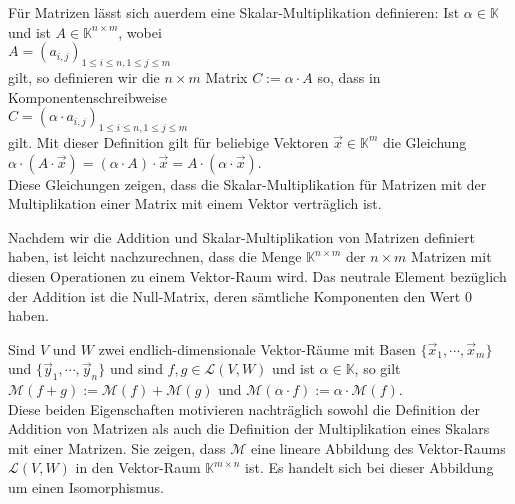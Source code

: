 F\"{u}r Matrizen l\"{a}sst sich au\3erdem eine Skalar-Multiplikation definieren:  Ist $\alpha \in \mathbb{K}$
und ist $A \in \mathbb{K}^{n \times m}$, wobei
\\[0.2cm]
\hspace*{1.3cm}
$A = (a_{i,j})_{1\leq i \leq n, 1 \leq j \leq m}$
\\[0.2cm]
gilt, so definieren wir die $n \times m$ Matrix 
$C := \alpha \cdot A$ so, dass in Komponentenschreibweise
\\[0.2cm]
\hspace*{1.3cm}
$C = (\alpha \cdot a_{i,j})_{1\leq i \leq n, 1 \leq j \leq m}$ 
\\[0.2cm]
gilt.  Mit
dieser Definition gilt f\"{u}r beliebige Vektoren $\vec{x} \in \mathbb{K}^m$ die Gleichung
\\[0.2cm]
\hspace*{1.3cm}
$\alpha \cdot (A \cdot \vec{x}) = (\alpha \cdot A) \cdot \vec{x} = A \cdot (\alpha \cdot \vec{x})$.
\\[0.2cm]
Diese Gleichungen zeigen, dass die Skalar-Multiplikation f\"{u}r Matrizen mit der Multiplikation einer
Matrix mit einem Vektor vertr\"{a}glich ist.

\remark
Nachdem wir die Addition und Skalar-Multiplikation von Matrizen definiert haben, ist leicht
nachzurechnen, dass die Menge $\mathbb{K}^{n \times m}$ der $n \times m$ Matrizen mit diesen
Operationen zu einem Vektor-Raum wird.  Das neutrale Element bez\"{u}glich der Addition ist die
Null-Matrix, deren s\"{a}mtliche Komponenten den Wert $0$ haben.

\remark
Sind $V$ und $W$ zwei endlich-dimensionale Vektor-R\"{a}ume mit Basen
$\{\vec{x}_1, \cdots, \vec{x}_m\}$ und $\{\vec{y}_1, \cdots, \vec{y}_n\}$ und sind $f, g \in \mathcal{L}(V, W)$ und ist $\alpha \in \mathbb{K}$, so gilt
\\[0.2cm]
\hspace*{1.3cm}
$\mathcal{M}(f+g) := \mathcal{M}(f) + \mathcal{M}(g)$ \quad und \quad
$\mathcal{M}(\alpha \cdot f) := \alpha \cdot \mathcal{M}(f)$.
\\[0.2cm]
Diese beiden Eigenschaften motivieren nachtr\"{a}glich sowohl die Definition der Addition von Matrizen
als auch die Definition der Multiplikation eines Skalars mit einer Matrizen.  
Sie zeigen, dass $\mathcal{M}$ eine lineare Abbildung des Vektor-Raums $\mathcal{L}(V,W)$ in den Vektor-Raum $\mathbb{K}^{m \times n}$ ist.  
Es handelt sich bei dieser Abbildung um einen Isomorphismus.
\eoxs



